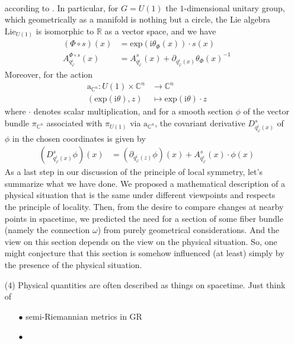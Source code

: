 \begin{enumerate}
\begin{align*}
\end{align*}
according to \cite{797789bc}.
In particular, for $G = U(1)$ the $1$-dimensional unitary group, which geometrically as a manifold is nothing but a circle, the Lie algebra $\mathrm{Lie}_{U(1)}$ is isomorphic to $\mathbb{R}$ as a vector space, and we have
\begin{align*}
  (\Phi \circ s)(x)
  &=
  \mathrm{exp}(\mathrm{i}\theta_{\Phi}(x))
  \cdot
  s(x)
  \\
  A_{q_{\varphi}^{i}}^{\Phi \circ s}(x)
  &=
  A_{q_{\varphi}^{i}}^{s}(x)
  +
  \partial_{q_{\varphi}^{i}(x)}
  \theta_{\Phi}(x)^{-1}
\end{align*}
Moreover, for the action
\begin{align*}
  \mathrm{a}_{\mathbb{C}^{n}}
  \colon
  U(1)
  \times
  \mathbb{C}^{n}
  &\rightarrow
  \mathbb{C}^{n}
  \\
  (\mathrm{exp}(\mathrm{i}\theta),z)
  &\mapsto
  \mathrm{exp}(\mathrm{i}\theta)
  \cdot
  z
\end{align*}
where $\cdot$ denotes scalar multiplication, and for a smooth section $\phi$ of the vector bundle $\pi_{\mathbb{C}^{n}}$ associated with $\pi_{U(1)}$ via $\mathrm{a}_{\mathbb{C}^{n}}$, the covariant derivative $D_{q_{\varphi}^{i}(x)}^{s}$ of $\phi$ in the chosen coordinates is given by
\begin{align*}
  \left(
    D_{q_{\varphi}^{i}(x)}^{s}
    \phi
  \right)
  (x)
  &=
  \left(
    \partial_{q_{\varphi}^{i}(z)}
    \phi
  \right)
  (x)
  +
  A_{q_{\varphi}^{i}}^{s}(x)
  \cdot
  \phi(x)
\end{align*}
As a last step in our discussion of the principle of local symmetry, let's summarize what we have done.
We proposed a mathematical description of a physical situation that is the same under different viewpoints and respects the principle of locality.
Then, from the desire to compare changes at nearby points in spacetime, we predicted the need for a section of some fiber bundle (namely the connection $\omega$) from purely geometrical considerations.
And the view on this section depends on the view on the physical situation.
So, one might conjecture that this section is somehow influenced (at least) simply by the presence of the physical situation.
\item[(4)]
Physical quantities are often described as things on spacetime.
Just think of
\begin{enumerate}
\item[$\bullet$]
semi-Riemannian metrics in GR
\item[$\bullet$]

\end{enumerate}
\end{enumerate}
